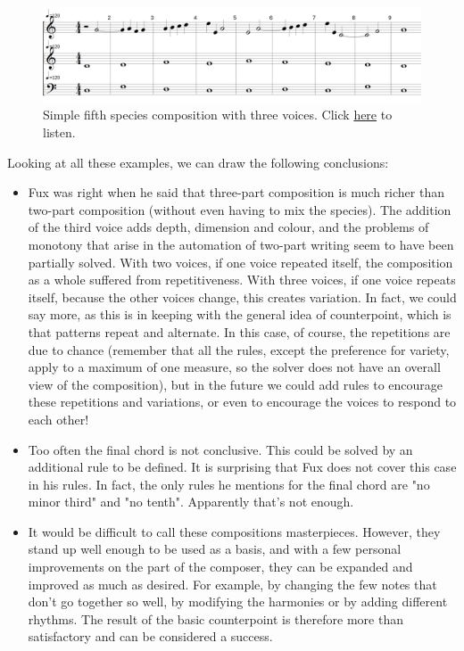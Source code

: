 \begin{figure}[h!]
    \centering
    \includegraphics[width=1\textwidth]{Images/Musicality/simple-test-5sp.png}
    \caption{Simple fifth species composition with three voices. Click \href{https://youtu.be/BSAKEjvFdoo}{here} to listen.}
    \label{fig:simple-test-5sp}
\end{figure}

Looking at all these examples, we can draw the following conclusions: 

\begin{itemize}
    \item Fux was right when he said that three-part composition is much richer than two-part composition (without even having to mix the species). The addition of the third voice adds depth, dimension and colour, and the problems of monotony that arise in the automation of two-part writing seem to have been partially solved. With two voices, if one voice repeated itself, the composition as a whole suffered from repetitiveness. With three voices, if one voice repeats itself, because the other voices change, this creates variation. In fact, we could say more, as this is in keeping with the general idea of counterpoint, which is that patterns repeat and alternate. In this case, of course, the repetitions are due to chance (remember that all the rules, except the preference for variety, apply to a maximum of one measure, so the solver does not have an overall view of the composition), but in the future we could add rules to encourage these repetitions and variations, or even to encourage the voices to respond to each other! 
    \item Too often the final chord is not conclusive. This could be solved by an additional rule to be defined. It is surprising that Fux does not cover this case in his rules. In fact, the only rules he mentions for the final chord are "no minor third" and "no tenth". Apparently that's not enough.
    \item It would be difficult to call these compositions masterpieces. However, they stand up well enough to be used as a basis, and with a few personal improvements on the part of the composer, they can be expanded and improved as much as desired. For example, by changing the few notes that don't go together so well, by modifying the harmonies or by adding different rhythms. The result of the basic counterpoint is therefore more than satisfactory and can be considered a success.
\end{itemize}


